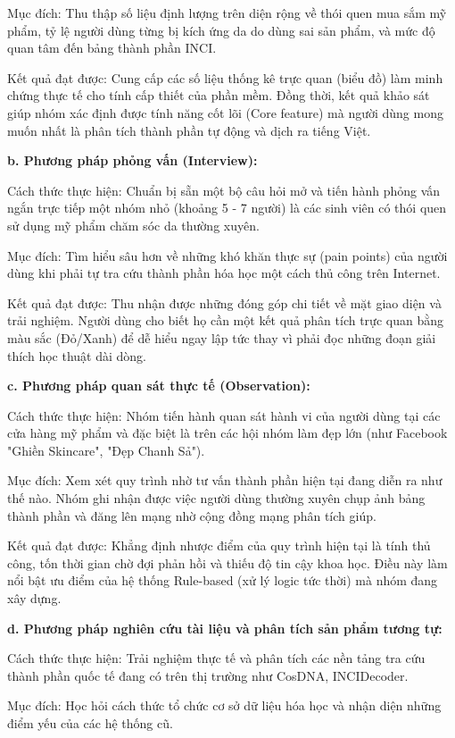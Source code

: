 \documentclass[12pt,a4paper]{article}
\begin{document}
Mục đích: Thu thập số liệu định lượng trên diện rộng về thói quen mua sắm mỹ phẩm, tỷ lệ người dùng từng bị kích ứng da do dùng sai sản phẩm, và mức độ quan tâm đến bảng thành phần INCI.

Kết quả đạt được: Cung cấp các số liệu thống kê trực quan (biểu đồ) làm minh chứng thực tế cho tính cấp thiết của phần mềm. Đồng thời, kết quả khảo sát giúp nhóm xác định được tính năng cốt lõi (Core feature) mà người dùng mong muốn nhất là phân tích thành phần tự động và dịch ra tiếng Việt.

\textbf{b. Phương pháp phỏng vấn (Interview):}

Cách thức thực hiện: Chuẩn bị sẵn một bộ câu hỏi mở và tiến hành phỏng vấn ngắn trực tiếp một nhóm nhỏ (khoảng 5 - 7 người) là các sinh viên có thói quen sử dụng mỹ phẩm chăm sóc da thường xuyên.

Mục đích: Tìm hiểu sâu hơn về những khó khăn thực sự (pain points) của người dùng khi phải tự tra cứu thành phần hóa học một cách thủ công trên Internet.

Kết quả đạt được: Thu nhận được những đóng góp chi tiết về mặt giao diện và trải nghiệm. Người dùng cho biết họ cần một kết quả phân tích trực quan bằng màu sắc (Đỏ/Xanh) để dễ hiểu ngay lập tức thay vì phải đọc những đoạn giải thích học thuật dài dòng.

\textbf{c. Phương pháp quan sát thực tế (Observation):}

Cách thức thực hiện: Nhóm tiến hành quan sát hành vi của người dùng tại các cửa hàng mỹ phẩm và đặc biệt là trên các hội nhóm làm đẹp lớn (như Facebook "Ghiền Skincare", "Đẹp Chanh Sả").

Mục đích: Xem xét quy trình nhờ tư vấn thành phần hiện tại đang diễn ra như thế nào. Nhóm ghi nhận được việc người dùng thường xuyên chụp ảnh bảng thành phần và đăng lên mạng nhờ cộng đồng mạng phân tích giúp.

Kết quả đạt được: Khẳng định nhược điểm của quy trình hiện tại là tính thủ công, tốn thời gian chờ đợi phản hồi và thiếu độ tin cậy khoa học. Điều này làm nổi bật ưu điểm của hệ thống Rule-based (xử lý logic tức thời) mà nhóm đang xây dựng.

\textbf{d. Phương pháp nghiên cứu tài liệu và phân tích sản phẩm tương tự:}

Cách thức thực hiện: Trải nghiệm thực tế và phân tích các nền tảng tra cứu thành phần quốc tế đang có trên thị trường như CosDNA, INCIDecoder.

Mục đích: Học hỏi cách thức tổ chức cơ sở dữ liệu hóa học và nhận diện những điểm yếu của các hệ thống cũ.
\end{document}
